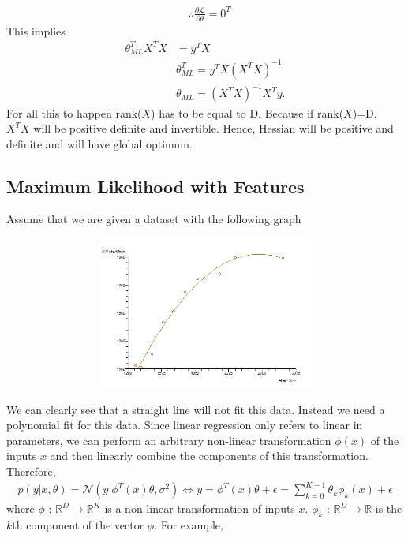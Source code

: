 \documentclass[12pt]{article}
\numberwithin{equation}{section}
\begin{document}
\begin{align*}
	&\therefore \frac{\partial\mathcal{L}}{\partial\theta} = 0^T
	\end{align*}
	This implies
	\begin{align*}
 \theta_{ML}^TX^TX &= y^TX\\
	&\theta_{ML}^T = y^TX(X^TX)^{-1}\\
	&\theta_{ML} = (X^TX)^{-1}X^Ty .
\end{align*}
For all this to happen rank($X$) has to be equal to D. Because if rank($X$)=D.\\
$X^TX$ will be positive definite and invertible. Hence, Hessian will be positive and definite and will  have global optimum.

\subsection{Maximum Likelihood with Features}
Assume that we are given a dataset with the following graph
\begin{center}
\includegraphics[width=15cm, height=5cm]{graph4}
\end{center}
We can clearly see that a straight line will not fit this data. Instead we need a polynomial fit for this data. Since linear regression only refers to linear in parameters, we can perform an arbitrary non-linear transformation $\phi(x)$ of the inputs $x$ and then linearly combine the components of this transformation. Therefore,
\begin{align*}
p(y|x,\theta) = \mathcal{N}(y|\phi^T(x)\theta, \sigma^2)\Leftrightarrow y = \phi^T(x)\theta + \epsilon = \sum_{k=0}^{K-1}\theta_{k}\phi_{k}(x) +\epsilon
\end{align*}
where $\phi$ : $\mathbb{R}^D \rightarrow \mathbb{R}^K$ is a non linear transformation of inputs $x$. $\phi_{k}$ : $\mathbb{R}^D \rightarrow \mathbb{R}$ is the $k$th component of the vector $\phi$. For example,
\end{document}
